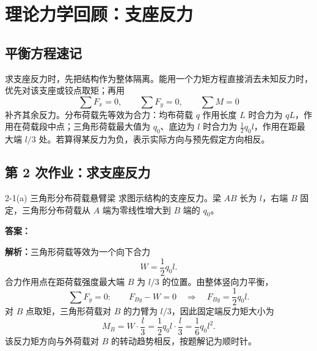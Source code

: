 \chapter{理论力学回顾：支座反力}

\section{平衡方程速记}

\begin{notecard}
求支座反力时，先把结构作为整体隔离。能用一个力矩方程直接消去未知反力时，优先对该支座或铰点取矩；再用
\[
  \sum F_x=0,\qquad \sum F_y=0,\qquad \sum M=0
\]
补齐其余反力。分布荷载先等效为合力：均布荷载 \(q\) 作用长度 \(L\) 时合力为 \(qL\)，作用在荷载段中点；三角形荷载最大值为 \(q_0\)、底边为 \(l\) 时合力为 \(\frac12q_0l\)，作用在距最大端 \(l/3\) 处。若算得某反力为负，表示实际方向与预先假定方向相反。
\end{notecard}

\section{第 2 次作业：求支座反力}

\begin{problemcard}{2-1(a) 三角形分布荷载悬臂梁}
求图示结构的支座反力。梁 \(AB\) 长为 \(l\)，右端 \(B\) 固定，三角形分布荷载从 \(A\) 端为零线性增大到 \(B\) 端的 \(q_0\)。

\begin{figure}[H]
\centering
{}
\end{figure}
\end{problemcard}

\begin{solutioncard}
\textbf{答案：}

\textbf{解析：}三角形荷载等效为一个向下合力
\[
  W=\frac12q_0l .
\]
合力作用点在距荷载强度最大端 \(B\) 为 \(l/3\) 的位置。由整体竖向力平衡，
\[
  \sum F_y=0:\qquad F_{By}-W=0
  \quad\Rightarrow\quad
  F_{By}=\frac12q_0l .
\]
对 \(B\) 点取矩，三角形荷载对 \(B\) 的力臂为 \(l/3\)，因此固定端反力矩大小为
\[
  M_B=W\cdot\frac{l}{3}
  =\frac12q_0l\cdot\frac{l}{3}
  =\frac16q_0l^2 .
\]
该反力矩方向与外荷载对 \(B\) 的转动趋势相反，按题解记为顺时针。
\end{solutioncard}

